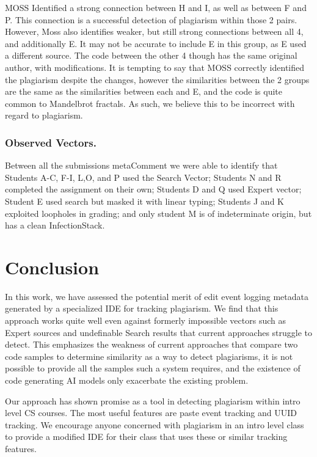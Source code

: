 \documentclass[10pt]{article}
\newcommand{\metaComment}{metaComment\xspace}
\newcommand{\infectionStack}{InfectionStack\xspace}
\begin{document}
MOSS Identified a strong connection between H and I, as well as between F and P.  This connection is a successful detection of plagiarism within those 2 pairs. However, Moss also identifies weaker, but still strong connections between all 4, and additionally E.  It may not be accurate to include E in this group, as E used a different source.  The code between the other 4 though has the same original author, with modifications.  It is tempting to say that MOSS correctly identified the plagiarism despite the changes, however the similarities between the 2 groups are the same as the similarities between each and E, and the code is quite common to Mandelbrot fractals.  As such, we believe this to be incorrect with regard to plagiarism.

\subsubsection{Observed Vectors.\hspace{0.5em}\phantom{}}

Between all the submissions \metaComment we were able to identify that Students A-C, F-I, L,O, and P used the Search Vector; Students N and R completed the assignment on their own; Students D and Q used Expert vector; Student E used search but masked it with linear typing; Students J and K exploited loopholes in grading; and only student M is of indeterminate origin, but has a clean \infectionStack.



\section{Conclusion}
In this work, we have assessed the potential merit of edit event logging metadata generated by a specialized IDE for tracking plagiarism.  We find that this approach works quite well even against formerly impossible vectors such as Expert sources and undefinable Search results that current approaches struggle to detect.  This emphasizes the weakness of current approaches that compare two code samples to determine similarity as a way to detect plagiarisms, it is not possible to provide all the samples such a system requires, and the existence of code generating AI models only exacerbate the existing problem.

Our approach has shown promise as a tool in detecting plagiarism within intro level CS courses.  The most useful features are paste event tracking and UUID tracking.  We encourage anyone concerned with plagiarism in an intro level class to provide a modified IDE for their class that uses these or similar tracking features.
\end{document}
